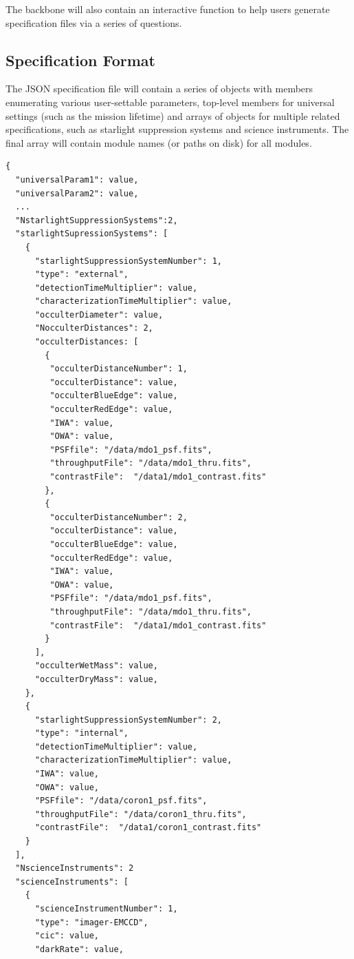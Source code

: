 \documentclass[cleanfoot]{asme2ej}
\begin{document}
The backbone will also contain an interactive function to help users generate specification files via a series of questions.



\subsection{Specification Format}
The JSON specification file will contain a series of objects with members enumerating various user-settable parameters, top-level members for universal settings (such as the mission lifetime) and arrays of objects for multiple related specifications, such as starlight suppression systems and science instruments.  The final array will contain module names (or paths on disk) for all modules.

\begin{verbatim}
{
  "universalParam1": value,
  "universalParam2": value,
  ...
  "NstarlightSuppressionSystems":2,
  "starlightSupressionSystems": [
    {
      "starlightSuppressionSystemNumber": 1,
      "type": "external",
      "detectionTimeMultiplier": value,
      "characterizationTimeMultiplier": value,
      "occulterDiameter": value,
      "NocculterDistances": 2,
      "occulterDistances: [
        {
         "occulterDistanceNumber": 1,
         "occulterDistance": value,
         "occulterBlueEdge": value,
         "occulterRedEdge": value,
         "IWA": value,
         "OWA": value,
         "PSFfile": "/data/mdo1_psf.fits",
         "throughputFile": "/data/mdo1_thru.fits",
         "contrastFile":  "/data1/mdo1_contrast.fits"
        },
        {
         "occulterDistanceNumber": 2,
         "occulterDistance": value,
         "occulterBlueEdge": value,
         "occulterRedEdge": value,
         "IWA": value,
         "OWA": value,
         "PSFfile": "/data/mdo1_psf.fits",
         "throughputFile": "/data/mdo1_thru.fits",
         "contrastFile":  "/data1/mdo1_contrast.fits"
        }
      ],
      "occulterWetMass": value,
      "occulterDryMass": value,
    },
    {
      "starlightSuppressionSystemNumber": 2,
      "type": "internal",
      "detectionTimeMultiplier": value,
      "characterizationTimeMultiplier": value,
      "IWA": value,
      "OWA": value,
      "PSFfile": "/data/coron1_psf.fits",
      "throughputFile": "/data/coron1_thru.fits",
      "contrastFile":  "/data1/coron1_contrast.fits"
    }
  ],
  "NscienceInstruments": 2
  "scienceInstruments": [
    {
      "scienceInstrumentNumber": 1,
      "type": "imager-EMCCD",
      "cic": value,
      "darkRate": value,

\end{verbatim}
\end{document}

